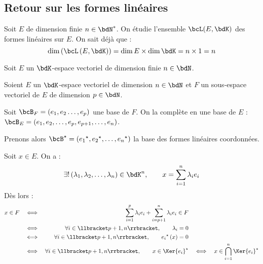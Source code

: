 \documentclass[a4paper,french,bookmarks]{article}
\begin{document}
\newpage

\subsection{Retour sur les formes linéaires}

Soit $E$ de dimension finie $n \in \bdN^*$. On étudie l'ensemble $\bcL(E, \bdK)$ des formes linéaires sur $E$. On sait déjà que :
%
\[\dim\left(\bcL\left(E, \bdK\right)\right) = \dim E \times \dim \bdK = n \times 1 = n\]

\begin{theorem}{}{}
    Soit $E$ un $\bdK$-espace vectoriel de dimension finie $n \in \bdN$.
    
\end{theorem}

\begin{nproof}
    Soient $E$ un $\bdK$-espace vectoriel de dimension $n \in \bdN$ et $F$ un sous-espace vectoriel de $E$ de dimension $p \in \bdN$.
    
    
    Soit $\bcB_F = \left(e_1, e_2 \dots, e_p\right)$ une base de $F$. On la complète en une base de $E$ : $\bcB_E = \left(e_1, e_2, \dots, e_p, e_{p+1}, \dots, e_n\right)$.
    
    Prenons alors $\bcB^\star = \left({e_1}^\star, {e_2}^\star, \dots,{e_n}^\star\right)$ la base des formes linéaires coordonnées.
    
    Soit $x \in E$. On a :
    \[ \exists ! \left(\lambda_1, \lambda_2, \dots, \lambda_n\right) \in \bdK^n,\qquad x = \sum_{i=1}^n \lambda_ie_i\]
    Dès lors :
    \begin{align*}
        x \in F &&\iff&& \sum_{i=1}^p \lambda_ie_i + \sum_{i=p+1}^n \lambda_ie_i \in F\\
        &&\iff&& \forall i \in \llbracket p+1, n\rrbracket,\qquad \lambda_i = 0\\
        &&\iff&& \forall i \in \llbracket p+1, n\rrbracket,\qquad {e_i}^\star\left(x\right) = 0\\
        &&\iff&& \forall i \in \llbracket p+1, n\rrbracket,\qquad x \in \Ker {e_i}^\star
        &&\iff&& x \in \bigcap_{i=1}^n \Ker {e_i}^\star
    \end{align*}
\end{nproof}
\end{document}
